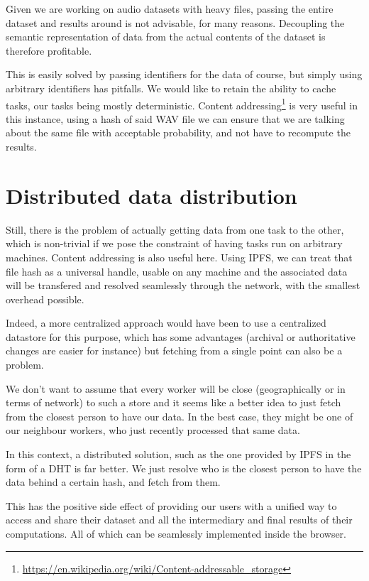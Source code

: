 \documentclass[12pt, a4paper]{article}
\begin{document}
Given we are working on audio datasets with heavy files, passing the entire dataset and results around is not advisable, for many reasons.
Decoupling the semantic representation of data from the actual contents of the dataset is therefore profitable.

This is easily solved by passing identifiers for the data of course, but simply using arbitrary identifiers has pitfalls.
We would like to retain the ability to cache tasks, our tasks being mostly deterministic.
Content
addressing\footnote{\url{https://en.wikipedia.org/wiki/Content-addressable_storage}} is very useful in this instance, using a hash of said WAV file we can ensure that
we are talking about the same file with acceptable probability, and not have to recompute the results.

\section{Distributed data distribution}

Still, there is the problem of actually getting data from one task to the other, which is non-trivial if we pose the constraint
of having tasks run on arbitrary machines. Content addressing is also useful here. Using IPFS, we can
treat that file hash as a universal handle, usable on any machine and the associated data will be
transfered and resolved seamlessly through the network, with the smallest overhead possible.

Indeed, a more centralized approach would have been to use a centralized datastore for this
purpose, which has some advantages (archival or authoritative changes are easier for instance)
but fetching from a single point can also be a problem.

We don't want to assume that every worker will be close (geographically or in terms of network) to
such a store and it seems like a better idea to just fetch from the closest person to have our data.
In the best case, they might be one of our neighbour workers, who just recently processed that same data.

In this context, a distributed solution, such as the one provided by IPFS in the form of a DHT is far better.
We just resolve who is the closest person to have the data behind a certain hash, and fetch from them.

This has the positive side effect of providing our users with a unified way to access and share
their dataset and all the intermediary and final results of their computations.
All of which can be seamlessly implemented inside the browser.
\end{document}
